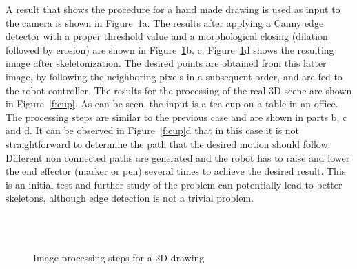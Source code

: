 \documentclass[conference]{IEEEtran}
\begin{document}
A result that shows the procedure for a hand made drawing is used as input to the camera is shown in Figure~\ref{f:triangle}a. The results after applying a Canny edge detector with a proper threshold value and a morphological closing (dilation followed by erosion) are shown in Figure~\ref{f:triangle}b, c. Figure~\ref{f:triangle}d shows the resulting image after skeletonization. The desired points are obtained from this latter image, by following the neighboring pixels in a subsequent order, and are fed to the robot controller. The results for the processing of the real 3D scene are shown in Figure~\ref{f:cup}. As can be seen, the input is a tea cup on a table in an office. The processing steps are similar to the previous case and are shown in parts b, c and d. It can be observed in Figure~\ref{f:cup}d that in this case it is not straightforward to determine the path that the desired motion should follow. Different non connected paths are generated and the robot has to raise and lower the end effector (marker or pen) several times to achieve the desired result. This is an initial test and further study of the problem can potentially lead to better skeletons, although edge detection is not a trivial problem.
\begin{figure}%
\centering
{}
~\\
~
\caption{Image processing steps for a 2D drawing} \label{f:triangle}
\end{figure}
\end{document}
